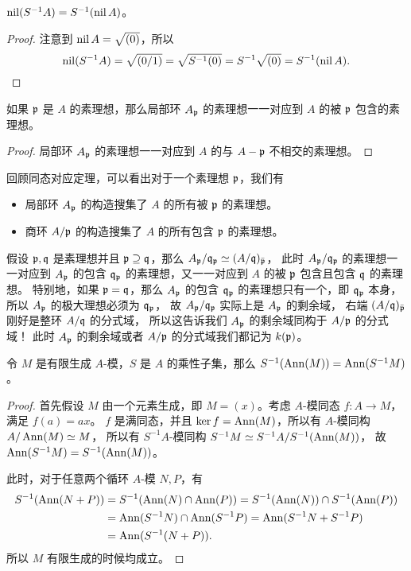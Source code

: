 \begin{corollary}
  $\operatorname{nil}(S^{-1}A)=S^{-1}(\operatorname{nil} A)$。
\end{corollary}
\begin{proof}
  注意到 $\operatorname{nil} A=\sqrt{(0)}$，所以
  \[
    \operatorname{nil}(S^{-1}A)=\sqrt{(0/1)}=\sqrt{S^{-1}(0)}=S^{-1}\sqrt{(0)}=S^{-1}(\operatorname{nil} A).\qedhere
  \]
\end{proof}

\begin{corollary}
  如果 $\mathfrak{p}$ 是 $A$ 的素理想，那么局部环 $A_{\mathfrak{p}}$ 的素理想一一对应到
  $A$ 的被 $\mathfrak{p}$ 包含的素理想。
\end{corollary}
\begin{proof}
  局部环 $A_{\mathfrak{p}}$ 的素理想一一对应到 $A$ 的与 $A-\mathfrak{p}$ 不相交的素理想。
\end{proof}

回顾同态对应定理，可以看出对于一个素理想 $\mathfrak{p}$，我们有
\begin{itemize}[nosep]
  \item 局部环 $A_{\mathfrak{p}}$ 的构造搜集了 $A$ 的所有被 $\mathfrak{p}$ 的素理想。
  \item 商环 $A/\mathfrak{p}$ 的构造搜集了 $A$ 的所有包含 $\mathfrak{p}$ 的素理想。
\end{itemize}
假设 $\mathfrak{p},\mathfrak{q}$ 是素理想并且 $\mathfrak{p}\supseteq \mathfrak{q}$，那么
$A_{\mathfrak{p}}/\mathfrak{q}_{\mathfrak{p}}\simeq (A/\mathfrak{q})_{\bar{\mathfrak{p}}}$，
此时 $A_{\mathfrak{p}}/\mathfrak{q}_{\mathfrak{p}}$ 的素理想一一对应到 $A_{\mathfrak{p}}$ 的包含 $\mathfrak{q}_{\mathfrak{p}}$
的素理想，又一一对应到 $A$ 的被 $\mathfrak{p}$ 包含且包含 $\mathfrak{q}$ 的素理想。
特别地，如果 $\mathfrak{p}=\mathfrak{q}$，那么 $A_{\mathfrak{p}}$
的包含 $\mathfrak{q}_{\mathfrak{p}}$ 的素理想只有一个，即 $\mathfrak{q}_{\mathfrak{p}}$ 本身，
所以 $A_{\mathfrak{p}}$ 的极大理想必须为 $\mathfrak{q}_{\mathfrak{p}}$，
故 $A_{\mathfrak{p}}/\mathfrak{q}_{\mathfrak{p}}$ 实际上是 $A_{\mathfrak{p}}$ 的剩余域，
右端 $(A/\mathfrak{q})_{\bar{\mathfrak{p}}}$ 刚好是整环 $A/\mathfrak{q}$ 的分式域，
所以这告诉我们 $A_{\mathfrak{p}}$ 的剩余域同构于 $A/\mathfrak{p}$ 的分式域！
此时 $A_{\mathfrak{p}}$ 的剩余域或者 $A/\mathfrak{p}$ 的分式域我们都记为 $k(\mathfrak{p})$。


\begin{proposition}
  令 $M$ 是有限生成 $A$-模，$S$ 是 $A$ 的乘性子集，那么 $S^{-1}(\operatorname{Ann}(M))=\operatorname{Ann}(S^{-1}M)$。
\end{proposition}
\begin{proof}
  首先假设 $M$ 由一个元素生成，即 $M=(x)$。考虑 $A$-模同态 $f:A\to M$，满足 $f(a)=ax$。
  $f$ 是满同态，并且 $\ker f=\operatorname{Ann}(M)$，所以有 $A$-模同构 $A/\operatorname{Ann}(M)\simeq M$，
  所以有 $S^{-1}A$-模同构 $S^{-1}M\simeq S^{-1}A/S^{-1}(\operatorname{Ann}(M))$，
  故 $\operatorname{Ann}(S^{-1}M)=S^{-1}(\operatorname{Ann}(M))$。

  此时，对于任意两个循环 $A$-模 $N,P$，有
  \begin{align*}
    S^{-1}(\operatorname{Ann}(N+P))&=S^{-1}(\operatorname{Ann}(N)\cap\operatorname{Ann}(P))=S^{-1}(\operatorname{Ann}(N))\cap S^{-1}(\operatorname{Ann}(P))\\
    &=\operatorname{Ann}(S^{-1}N)\cap \operatorname{Ann}(S^{-1}P)=\operatorname{Ann}(S^{-1}N+S^{-1}P)\\
    &=\operatorname{Ann}(S^{-1}(N+P)).
  \end{align*}
  所以 $M$ 有限生成的时候均成立。
\end{proof}

